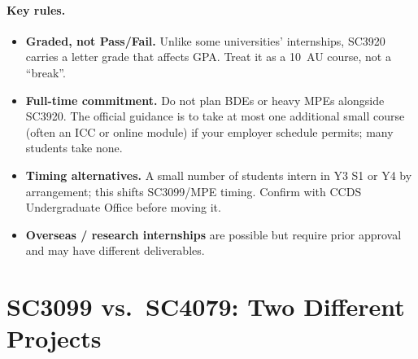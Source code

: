\paragraph{Key rules.}
\begin{itemize}
    \item \textbf{Graded, not Pass/Fail.} Unlike some universities' internships, SC3920 carries a letter grade that affects GPA. Treat it as a 10~AU course, not a ``break''.
    \item \textbf{Full-time commitment.} Do not plan BDEs or heavy MPEs alongside SC3920. The official guidance is to take at most one additional small course (often an ICC or online module) if your employer schedule permits; many students take none.
    \item \textbf{Timing alternatives.} A small number of students intern in Y3 S1 or Y4 by arrangement; this shifts SC3099/MPE timing. Confirm with CCDS Undergraduate Office before moving it.
    \item \textbf{Overseas / research internships} are possible but require prior approval and may have different deliverables.
\end{itemize}

\begin{center}
\end{center}

\section{SC3099 vs.\ SC4079: Two Different Projects}
\label{sec:capstone-vs-fyp}

